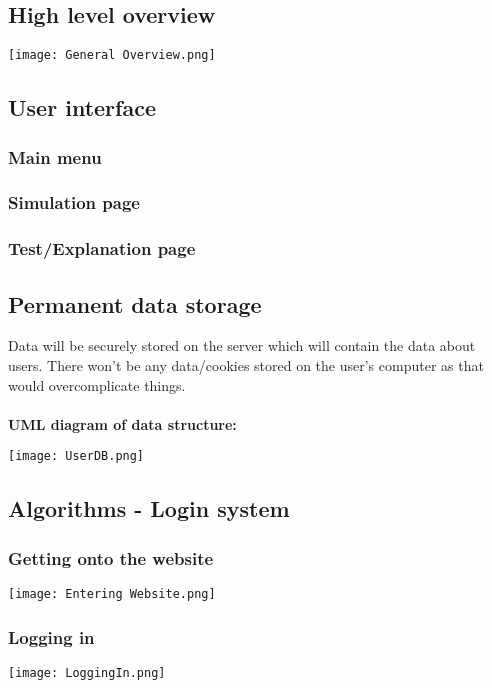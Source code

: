 \documentclass[12pt]{article}
\begin{document}
\subsection{High level overview}
\begin{center}
    \texttt{[image: General Overview.png]} 
\end{center}

\newpage
\subsection{User interface}
\subsubsection{Main menu}
\subsubsection{Simulation page}
\subsubsection{Test/Explanation page}

\newpage
\subsection{Permanent data storage}
Data will be securely stored on the server which will contain the data about users. There won't be any data/cookies stored on the user's computer as that would overcomplicate things.\\\\
\textbf{UML diagram of data structure: }
\begin{center}
    \texttt{[image: UserDB.png]} 
\end{center}

\newpage
\subsection{Algorithms - Login system}
\subsubsection{Getting onto the website}
\begin{center}
    \texttt{[image: Entering Website.png]} 
\end{center}

\subsubsection{Logging in}
\begin{center}
    \texttt{[image: LoggingIn.png]} 
\end{center}
\end{document}
